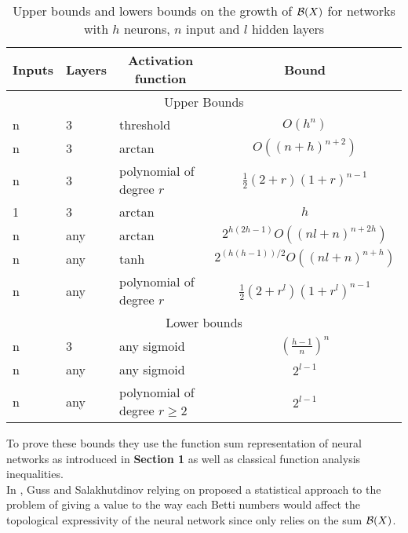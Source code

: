 \documentclass[12pt, a4paper]{article}
\begin{document}
\begin{table}[H]
  \begin{center}
    \begin{tabular}{| l | l | l | c |}
      \hline
Inputs                  & \multicolumn{1}{c|}{Layers} & \multicolumn{1}{c|}{Activation function} & \multicolumn{1}{c|}{Bound} \\
      \hline
\multicolumn{4}{|c|}{Upper Bounds}                            \\
      \hline
n      & 3      & threshold           & $O(h^n)$            \\
      \hline
n      & 3      & arctan           & $O((n+h)^{n+2})$            \\
      \hline
n      & 3      & polynomial of degree $r$           & $\frac{1}{2}(2+r)(1+r)^{n-1}$            \\
      \hline
1      & 3      & arctan           & $h$            \\
      \hline
n      & any    & arctan           & $2^{h(2h-1)}O((nl+n)^{n+2h})$            \\
      \hline
n      & any    & tanh           & $2^{(h(h-1))/2}O((nl+n)^{n+h})$            \\
      \hline
n      & any      & polynomial of degree $r$           & $\frac{1}{2}(2+r^l)(1+r^l)^{n-1}$            \\
      \hline
\multicolumn{4}{|c|}{Lower bounds}                            \\
      \hline
n      & 3      & any sigmoid         & $(\frac{h-1}{n})^n$\\
      \hline
n      & any & any sigmoid         & $2^{l-1}$ \\
      \hline
n      & any      & polynomial of degree $r \ge 2$    & $2^{l-1}$\\
      \hline
\end{tabular}
  \end{center}
  
  \caption{Upper bounds and lowers bounds on the growth of $\mathcal{B}(X)$ for networks with $h$ neurons, $n$ input and $l$ hidden layers}
  \label{tab:betti_up_low_bound}
\end{table}

To prove these bounds they use the function sum representation of neural networks as introduced in \textbf{Section 1} as well as classical function analysis inequalities.\\

In \cite{guss_characterizing_2018}, Guss and Salakhutdinov relying on \cite{bianchini_complexity_2014} proposed a statistical approach to the problem of giving a value to the way each Betti numbers would affect the topological expressivity of the neural network since \cite{bianchini_complexity_2014} only relies on the sum $\mathcal{B}(X)$.\\
\end{document}

